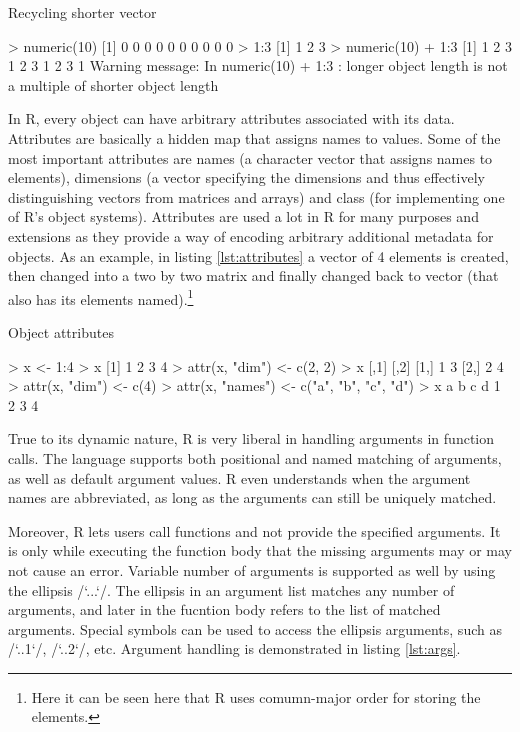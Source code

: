 {\begin{listing}[htbp]
  \caption{\label{lst:recycling}Recycling shorter vector}
  \begin{rcode}
> numeric(10)
 [1] 0 0 0 0 0 0 0 0 0 0
> 1:3
[1] 1 2 3
> numeric(10) + 1:3
 [1] 1 2 3 1 2 3 1 2 3 1
Warning message:
In numeric(10) + 1:3 :
  longer object length is not a multiple of shorter object length
  \end{rcode}
\end{listing}

In R, every object can have arbitrary attributes associated with its data. Attributes are basically a hidden map that assigns names to values. Some of the most important attributes are names (a character vector that assigns names to elements), dimensions (a vector specifying the dimensions and thus effectively distinguishing vectors from matrices and arrays) and class (for implementing one of R's object systems). Attributes are used a lot in R for many purposes and extensions as they provide a way of encoding arbitrary additional metadata for objects. As an example, in listing \ref{lst:attributes} a vector of 4 elements is created, then changed into a two by two matrix and finally changed back to vector (that also has its elements named).\footnote{Here it can be seen here that R uses comumn-major order for storing the elements.}

\begin{listing}[htbp]
  \caption{\label{lst:attributes}Object attributes}
  \begin{rcode}
> x <- 1:4
> x
[1] 1 2 3 4
> attr(x, "dim") <- c(2, 2)
> x
     [,1] [,2]
[1,]    1    3
[2,]    2    4
> attr(x, "dim") <- c(4)
> attr(x, "names") <- c("a", "b", "c", "d")
> x
a b c d 
1 2 3 4 
  \end{rcode}
\end{listing}

True to its dynamic nature, R is very liberal in handling arguments in function calls. The language supports both positional and named matching of arguments, as well as default argument values. R even understands when the argument names are abbreviated, as long as the arguments can still be uniquely matched.

Moreover, R lets users call functions and not provide the specified arguments. It is only while executing the function body that the missing arguments may or may not cause an error. Variable number of arguments is supported as well by using the ellipsis \rinline/`...`/. The ellipsis in an argument list matches any number of arguments, and later in the fucntion body refers to the list of matched arguments. Special symbols can be used to access the ellipsis arguments, such as \rinline/`..1`/, \rinline/`..2`/, etc. Argument handling is demonstrated in listing \ref{lst:args}.

}
